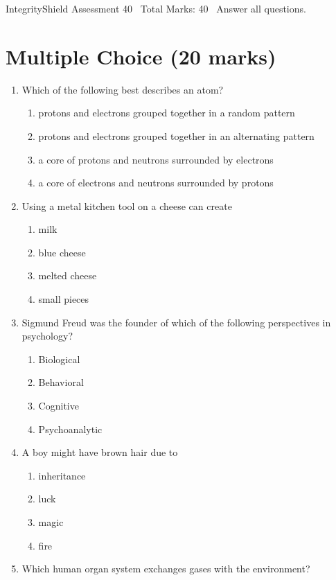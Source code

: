 \documentclass[12pt]{article}
\begin{document}
\begin{center}
IntegrityShield Assessment 40 \
Total Marks: 40 \
Answer all questions.
\end{center}

\section*{Multiple Choice (20 marks)}
\begin{enumerate}[label=\arabic*.]
\item Which of the following best describes an atom?
\begin{enumerate}[label=(\alph*)]
    \item protons and electrons grouped together in a random pattern
    \item protons and electrons grouped together in an alternating pattern
    \item a core of protons and neutrons surrounded by electrons
    \item a core of electrons and neutrons surrounded by protons
\end{enumerate}
\item Using a metal kitchen tool on a cheese can create
\begin{enumerate}[label=(\alph*)]
    \item milk
    \item blue cheese
    \item melted cheese
    \item small pieces
\end{enumerate}
\item Sigmund Freud was the founder of which of the following perspectives in psychology?
\begin{enumerate}[label=(\alph*)]
    \item Biological
    \item Behavioral
    \item Cognitive
    \item Psychoanalytic
\end{enumerate}
\item A boy might have brown hair due to
\begin{enumerate}[label=(\alph*)]
    \item inheritance
    \item luck
    \item magic
    \item fire
\end{enumerate}
\item Which human organ system exchanges gases with the environment?

\end{enumerate}
\end{document}
